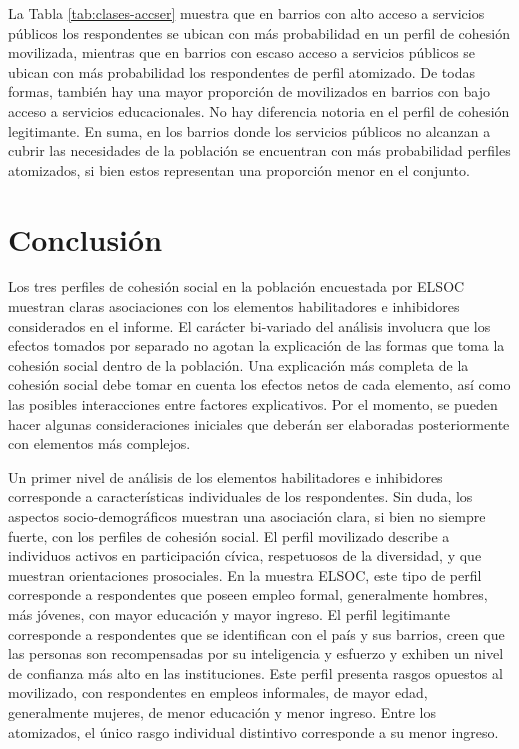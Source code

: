 \documentclass[
  12pt,
]{book}
\begin{document}
La Tabla \ref{tab:clases-accser} muestra que en barrios con alto acceso a servicios públicos los respondentes se ubican con más probabilidad en un perfil de cohesión movilizada, mientras que en barrios con escaso acceso a servicios públicos se ubican con más probabilidad los respondentes de perfil atomizado. De todas formas, también hay una mayor proporción de movilizados en barrios con bajo acceso a servicios educacionales. No hay diferencia notoria en el perfil de cohesión legitimante. En suma, en los barrios donde los servicios públicos no alcanzan a cubrir las necesidades de la población se encuentran con más probabilidad perfiles atomizados, si bien estos representan una proporción menor en el conjunto.

\hypertarget{conclusiuxf3n-1}{%
\section{Conclusión}\label{conclusiuxf3n-1}}

Los tres perfiles de cohesión social en la población encuestada por ELSOC muestran claras asociaciones con los elementos habilitadores e inhibidores considerados en el informe. El carácter bi-variado del análisis involucra que los efectos tomados por separado no agotan la explicación de las formas que toma la cohesión social dentro de la población. Una explicación más completa de la cohesión social debe tomar en cuenta los efectos netos de cada elemento, así como las posibles interacciones entre factores explicativos. Por el momento, se pueden hacer algunas consideraciones iniciales que deberán ser elaboradas posteriormente con elementos más complejos.

Un primer nivel de análisis de los elementos habilitadores e inhibidores corresponde a características individuales de los respondentes. Sin duda, los aspectos socio-demográficos muestran una asociación clara, si bien no siempre fuerte, con los perfiles de cohesión social. El perfil movilizado describe a individuos activos en participación cívica, respetuosos de la diversidad, y que muestran orientaciones prosociales. En la muestra ELSOC, este tipo de perfil corresponde a respondentes que poseen empleo formal, generalmente hombres, más jóvenes, con mayor educación y mayor ingreso. El perfil legitimante corresponde a respondentes que se identifican con el país y sus barrios, creen que las personas son recompensadas por su inteligencia y esfuerzo y exhiben un nivel de confianza más alto en las instituciones. Este perfil presenta rasgos opuestos al movilizado, con respondentes en empleos informales, de mayor edad, generalmente mujeres, de menor educación y menor ingreso. Entre los atomizados, el único rasgo individual distintivo corresponde a su menor ingreso.
\end{document}
